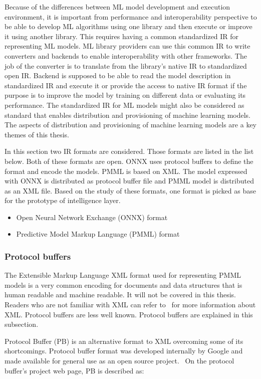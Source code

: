 \documentclass[english, 12pt, a4paper, elec, utf8, online]{aaltothesis}
\begin{document}
Because of the differences between ML model development and execution environment, it is important from performance and interoperability perspective to be able to develop ML algorithms using one library and then execute or improve it using another library. This requires having a common standardized IR for representing ML models. ML library providers can use this common IR to write converters and backends to enable interoperability with other frameworks. The job of the converter is to translate from the library's native IR to standardized open IR. Backend is supposed to be able to read the model description in standardized IR and execute it or provide the access to native IR format if the purpose is to improve the model by training on different data or evaluating its performance. The standardized IR for ML models might also be considered as standard that enables distribution and provisioning of machine learning models. The aspects of distribution and provisioning of machine learning models are a key themes of this thesis.

In this section two IR formats are considered. Those formats are listed in the list below. Both of these formats are open. ONNX uses protocol buffers to define the format  and encode the models. PMML is based on XML. The model expressed with ONNX is distributed as protocol buffer file and PMML model is distributed as an XML file. Based on the study of these formats, one format is picked as base for the prototype of intelligence layer.

\begin{itemize}
\item
Open Neural Network Exchange (ONNX) format
\item
Predictive Model Markup Language (PMML) format
\end{itemize}

\subsubsection{Protocol buffers}
The Extensible Markup Language XML format used for representing PMML models is a very common encoding for documents and data structures that is human readable and machine readable. It will not be covered in this thesis. Readers who are not familiar with XML can refer to~\cite{bray2008extensible} for more information about XML. Protocol buffers are less well known. Protocol buffers are explained in this subsection.

Protocol Buffer (PB) is an alternative format to XML overcoming some of its shortcomings. Protocol buffer format was developed internally by Google and made available for general use as an open source project.~\cite{kaur2010evaluation} On the protocol buffer's project web page, PB is described as:
\end{document}
